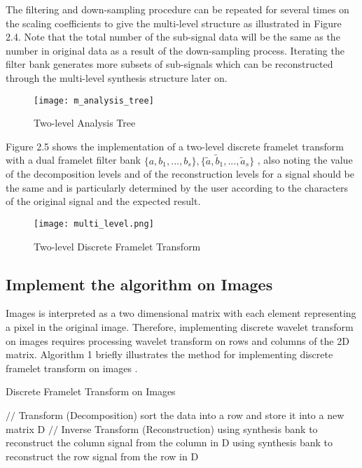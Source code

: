 The filtering and down-sampling procedure can be repeated for several times on the scaling coefficients to give the multi-level structure as illustrated in Figure 2.4. Note that the total number of the sub-signal data will be the same as the number in original data as a result of the down-sampling process. Iterating the filter bank generates more subsets of sub-signals which can be reconstructed through the multi-level synthesis structure later on.
\begin{figure}[htb]
\centering
\texttt{[image: m\_analysis\_tree]}
\caption{Two-level Analysis Tree}
\end{figure}

Figure 2.5 shows the implementation of a two-level discrete framelet transform with a dual framelet filter bank $ \{a,b_1,...,b_s\}, \{\tilde{a},\tilde{b}_1,...,\tilde{a}_s\}$ , also noting the value of the decomposition levels and of the reconstruction levels for a signal should be the same and is particularly determined by the user according to the characters of the original signal and the expected result.

\begin{figure}[htb]
\centering
\texttt{[image: multi\_level.png]}
\caption{Two-level Discrete Framelet Transform}
\end{figure}



\subsection{Implement the algorithm on Images}
Images is interpreted as a two dimensional matrix with each element representing a pixel in the original image. Therefore, implementing discrete wavelet transform on images requires processing wavelet transform on rows and columns of the 2D matrix. Algorithm 1 briefly illustrates the method for implementing discrete framelet transform on images .


\begin{algorithm}  
\caption{Discrete Framelet Transform on Images}  
\label{alg:1}  
\begin{algorithmic}
\STATE $//$ Transform (Decomposition)
\STATE sort the data into a row and store it into a new matrix D
\ENDFOR
{}
\ENDFOR
\STATE $//$ Inverse Transform (Reconstruction)
\STATE using synthesis bank to reconstruct the column signal from the column in D
\ENDFOR
{}
\STATE using synthesis bank to reconstruct the row signal from the row in D
\ENDFOR

\end{algorithmic}  
\end{algorithm}  

